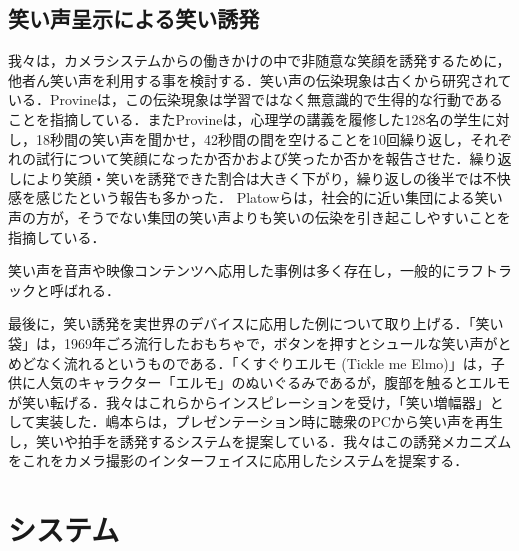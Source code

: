 \documentclass[submit,techreq]{ec2014}
\begin{document}
\subsection{笑い声呈示による笑い誘発}

我々は，カメラシステムからの働きかけの中で非随意な笑顔を誘発するために，他者ん笑い声を利用する事を検討する．笑い声の伝染現象は古くから研究されている．Provineは，この伝染現象は学習ではなく無意識的で生得的な行動であることを指摘している\cite{provine1996laughter}．またProvineは，心理学の講義を履修した128名の学生に対し，18秒間の笑い声を聞かせ，42秒間の間を空けることを10回繰り返し，それぞれの試行について笑顔になったか否かおよび笑ったか否かを報告させた\cite{provine1992contagious}．繰り返しにより笑顔・笑いを誘発できた割合は大きく下がり，繰り返しの後半では不快感を感じたという報告も多かった． Platowらは，社会的に近い集団による笑い声の方が，そうでない集団の笑い声よりも笑いの伝染を引き起こしやすいことを指摘している\cite{platow41n}．

笑い声を音声や映像コンテンツへ応用した事例は多く存在し，一般的にラフトラックと呼ばれる．

最後に，笑い誘発を実世界のデバイスに応用した例について取り上げる．「笑い袋」は，1969年ごろ流行したおもちゃで，ボタンを押すとシュールな笑い声がとめどなく流れるというものである．「くすぐりエルモ (Tickle me Elmo)」\cite{ticklemeelmo}は，子供に人気のキャラクター「エルモ」のぬいぐるみであるが，腹部を触るとエルモが笑い転げる．我々はこれらからインスピレーションを受け，「笑い増幅器」として実装した\cite{fukushima2010}．嶋本らは，プレゼンテーション時に聴衆のPCから笑い声を再生し，笑いや拍手を誘発するシステムを提案している．我々はこの誘発メカニズムをこれをカメラ撮影のインターフェイスに応用したシステムを提案する．

\section{システム}
\end{document}
